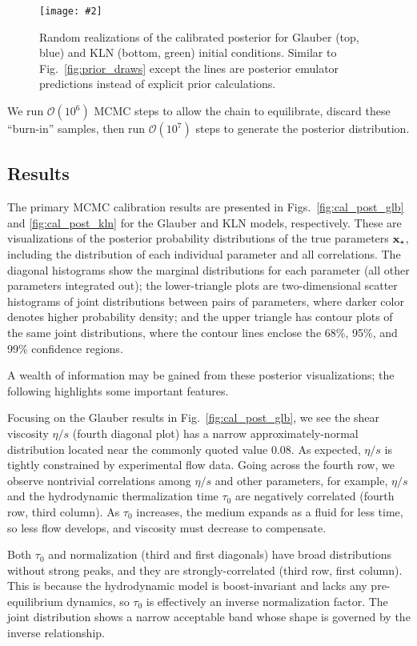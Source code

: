 \documentclass[aps,prc,reprint,superscriptaddress,amsmath]{revtex4-1}
\newcommand{\widefig}[3][t]{
  \begin{figure*}[#1]
    \texttt{[image: \#2]}
    \caption{\label{fig:#2}#3}
  \end{figure*}
}
\newcommand{\order}[1]{$\mathcal O(10^{#1})$}
\begin{document}
\widefig{post_draws}{
  Random realizations of the calibrated posterior for Glauber (top, blue) and KLN (bottom, green) initial conditions.
  Similar to Fig.~\ref{fig:prior_draws} except the lines are posterior emulator predictions instead of explicit prior calculations.
}

We run \order 6 MCMC steps to allow the chain to equilibrate, discard these ``burn-in'' samples, then run \order 7 steps to generate the posterior distribution.

\subsection{\label{sec:results}Results}

The primary MCMC calibration results are presented in Figs.~\ref{fig:cal_post_glb} and \ref{fig:cal_post_kln} for the Glauber and KLN models, respectively.
These are visualizations of the posterior probability distributions of the true parameters $\mathbf x_\star$, including the distribution of each individual parameter and all correlations.
The diagonal histograms show the marginal distributions for each parameter (all other parameters integrated out);
the lower-triangle plots are two-dimensional scatter histograms of joint distributions between pairs of parameters, where darker color denotes higher probability density;
and the upper triangle has contour plots of the same joint distributions, where the contour lines enclose the 68\%, 95\%, and 99\% confidence regions.

A wealth of information may be gained from these posterior visualizations; the following highlights some important features.

Focusing on the Glauber results in Fig.~\ref{fig:cal_post_glb}, we see the shear viscosity $\eta/s$ (fourth diagonal plot) has a narrow approximately-normal distribution located near the commonly quoted value 0.08.
As expected, $\eta/s$ is tightly constrained by experimental flow data.
Going across the fourth row, we observe nontrivial correlations among $\eta/s$ and other parameters, for example, $\eta/s$ and the hydrodynamic thermalization time $\tau_0$ are negatively correlated (fourth row, third column).
As $\tau_0$ increases, the medium expands as a fluid for less time, so less flow develops, and viscosity must decrease to compensate.

Both $\tau_0$ and normalization (third and first diagonals) have broad distributions without strong peaks, and they are strongly-correlated (third row, first column).
This is because the hydrodynamic model is boost-invariant and lacks any pre-equilibrium dynamics, so $\tau_0$ is effectively an inverse normalization factor.
The joint distribution shows a narrow acceptable band whose shape is governed by the inverse relationship.
\end{document}
